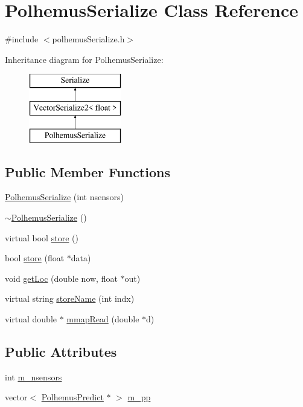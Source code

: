 \hypertarget{classPolhemusSerialize}{\section{Polhemus\-Serialize Class Reference}
\label{classPolhemusSerialize}
}


{\ttfamily \#include $<$polhemus\-Serialize.\-h$>$}

Inheritance diagram for Polhemus\-Serialize\-:\begin{figure}[H]
\begin{center}
\leavevmode
\includegraphics[height=3.000000cm]{classPolhemusSerialize}
\end{center}
\end{figure}
\subsection*{Public Member Functions}
\begin{DoxyCompactItemize}
\item 
\hyperlink{classPolhemusSerialize_ab302551eb8fc12cfda3af393a00ac63d}{Polhemus\-Serialize} (int nsensors)
\item 
\hyperlink{classPolhemusSerialize_a769685eca980416c300dccae33d7ebf7}{$\sim$\-Polhemus\-Serialize} ()
\item 
virtual bool \hyperlink{classPolhemusSerialize_a6cc3ac73da741cdeca76762ce991069c}{store} ()
\item 
bool \hyperlink{classPolhemusSerialize_a62051ba5f26905394ea7d0216cb0528f}{store} (float $\ast$data)
\item 
void \hyperlink{classPolhemusSerialize_ae973aa5770841739a7eb97a0d802f910}{get\-Loc} (double now, float $\ast$out)
\item 
virtual string \hyperlink{classPolhemusSerialize_a9f6cdf8427769c6e23ab2afc7cab07ce}{store\-Name} (int indx)
\item 
virtual double $\ast$ \hyperlink{classPolhemusSerialize_ac52dec8b5067a7f15a34c9e849be9eff}{mmap\-Read} (double $\ast$d)
\end{DoxyCompactItemize}
\subsection*{Public Attributes}
\begin{DoxyCompactItemize}
\item 
int \hyperlink{classPolhemusSerialize_a9cd18195743c2ac0a24f904dce28e1b8}{m\-\_\-nsensors}
\item 
vector$<$ \hyperlink{classPolhemusPredict}{Polhemus\-Predict} $\ast$ $>$ \hyperlink{classPolhemusSerialize_a07c4bd4c4bcf062c37954b5317608c0b}{m\-\_\-pp}
\end{DoxyCompactItemize}


